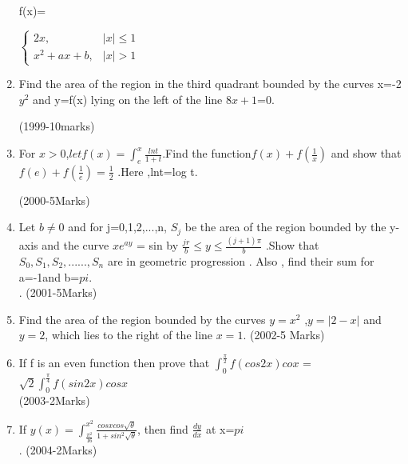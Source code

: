 \documentclass[journal,12pt,twocolumn]{IEEEtran}
\theoremstyle{remark}
\begin{document}
\begin{enumerate}
f(x)=
							
$\begin{cases}

2x,& |x|\le1\\
x^2+ax+b,&|x|>1

\end{cases}$
							

							
\item Find the area of the region in the third quadrant bounded by the curves x=-2$y^2$ and y=f(x) lying on the left of the line $8x+1$=0.  
							
\hfill{(1999-10marks)}\\
														    
							      \item For $x > 0 $,$let f(x)=\int_{e}^{x}\frac{lnt}{1+t}$.Find the function$ f(x) + f(\frac{1}{x})$
and show that $f(e)+f(\frac{1}{e})=
\frac{1}{2}$ .Here ,lnt=log t.
							

\hfill{(2000-5Marks)}
															    \item Let $b\neq0$ and for j=0,1,2,...,n, $S_j$ be the area of the region bounded by the y-axis and the curve $xe^{ay}$ = sin by $\frac{jr}{b} \le y \le \frac{(j+1)\pi}{b}$ .Show that  $S_0,S_1,S_2,......,S_n$ are in geometric progression . Also , find their sum for a=-1and b=$pi$.\\.
															      \hfill{(2001-5Marks)}
					

\item Find the area of the region bounded by the curves $y=x^2$ ,$y=|2-x|$ and $y=2$, which lies to the right of the line $x=1$.
								\hfill{(2002-5 Marks)}
							       \item If f is an even function then prove that 																	 
$\int_{0}^{\frac{\pi}{2}}f(cos2x)cox $ =$\sqrt{2}\int_{0}^{\frac{\pi}{4}}f(sin2x)cosx$\\												
\hfill{(2003-2Marks)}
																	        
							      \item If $y(x)=\int_{\frac{\pi^2}{16}}^{x^2}\frac{cosxcos\sqrt{\theta}}{1+sin^2\sqrt{\theta}}$, then find $\frac{dy}{dx}$ at x=$pi$\\.
								\hfill{(2004-2Marks)}


\end{enumerate}
\end{document}
